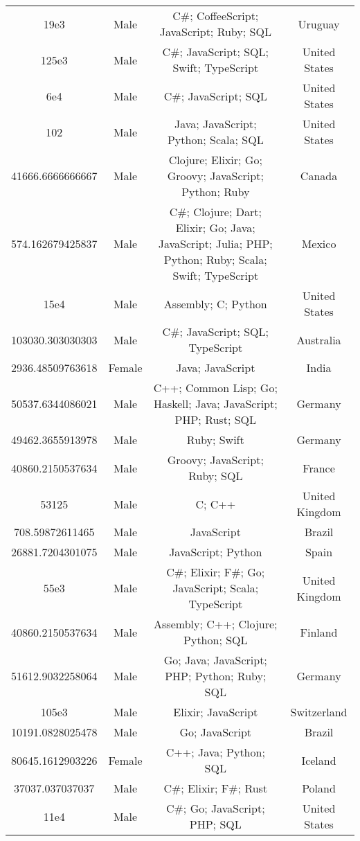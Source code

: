 \begin{center}
\begin{tabular}{ |c|c|c|c| }
19e3  &  Male  &  C\#; CoffeeScript; JavaScript; Ruby; SQL  &  Uruguay  \\ 
125e3  &  Male  &  C\#; JavaScript; SQL; Swift; TypeScript  &  United States  \\ 
6e4  &  Male  &  C\#; JavaScript; SQL  &  United States  \\ 
102  &  Male  &  Java; JavaScript; Python; Scala; SQL  &  United States  \\ 
41666.6666666667  &  Male  &  Clojure; Elixir; Go; Groovy; JavaScript; Python; Ruby  &  Canada  \\ 
574.162679425837  &  Male  &  C\#; Clojure; Dart; Elixir; Go; Java; JavaScript; Julia; PHP; Python; Ruby; Scala; Swift; TypeScript  &  Mexico  \\ 
15e4  &  Male  &  Assembly; C; Python  &  United States  \\ 
103030.303030303  &  Male  &  C\#; JavaScript; SQL; TypeScript  &  Australia  \\ 
2936.48509763618  &  Female  &  Java; JavaScript  &  India  \\ 
50537.6344086021  &  Male  &  C++; Common Lisp; Go; Haskell; Java; JavaScript; PHP; Rust; SQL  &  Germany  \\ 
49462.3655913978  &  Male  &  Ruby; Swift  &  Germany  \\ 
40860.2150537634  &  Male  &  Groovy; JavaScript; Ruby; SQL  &  France  \\ 
53125  &  Male  &  C; C++  &  United Kingdom  \\ 
708.59872611465  &  Male  &  JavaScript  &  Brazil  \\ 
26881.7204301075  &  Male  &  JavaScript; Python  &  Spain  \\ 
55e3  &  Male  &  C\#; Elixir; F\#; Go; JavaScript; Scala; TypeScript  &  United Kingdom  \\ 
40860.2150537634  &  Male  &  Assembly; C++; Clojure; Python; SQL  &  Finland  \\ 
51612.9032258064  &  Male  &  Go; Java; JavaScript; PHP; Python; Ruby; SQL  &  Germany  \\ 
105e3  &  Male  &  Elixir; JavaScript  &  Switzerland  \\ 
10191.0828025478  &  Male  &  Go; JavaScript  &  Brazil  \\ 
80645.1612903226  &  Female  &  C++; Java; Python; SQL  &  Iceland  \\ 
37037.037037037  &  Male  &  C\#; Elixir; F\#; Rust  &  Poland  \\ 
11e4  &  Male  &  C\#; Go; JavaScript; PHP; SQL  &  United States  \\ 

\end{tabular}
\end{center}

